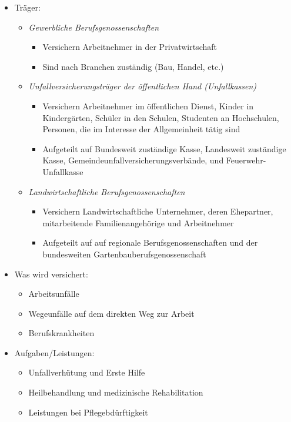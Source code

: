 \documentclass[a4paper, 12pt]{report}
\begin{document}
\begin{multicols}{2}
\begin{itemize}
    \item Träger:
	\begin{itemize}
	    \item \emph{Gewerbliche Berufsgenossenschaften}
		\begin{itemize}
		    \item Versichern Arbeitnehmer in der Privatwirtschaft
		    \item Sind nach Branchen zuständig (Bau, Handel, etc.)
		\end{itemize}
	    \item \emph{Unfallversicherungsträger der öffentlichen Hand
		(Unfallkassen)}
		\begin{itemize}
		    \item Versichern Arbeitnehmer im öffentlichen Dienst, Kinder
			in Kindergärten, Schüler in den Schulen, Studenten an
			Hochschulen, Personen, die im Interesse der
			Allgemeinheit tätig sind
		    \item Aufgeteilt auf Bundesweit zuständige Kasse, Landesweit
			zuständige Kasse, Gemeindeunfallversicherungsverbände,
			und Feuerwehr-Unfallkasse
		\end{itemize}
	    \item \emph{Landwirtschaftliche Berufsgenossenschaften}
		\begin{itemize}
		    \item Versichern Landwirtschaftliche Unternehmer, deren
			Ehepartner, mitarbeitende Familienangehörige und
			Arbeitnehmer
		    \item Aufgeteilt auf auf regionale Berufsgenossenschaften
			und der bundesweiten Gartenbauberufsgenossenschaft
		\end{itemize}
	\end{itemize}
    \item Was wird versichert:
	\begin{itemize}
	    \item Arbeitsunfälle
	    \item Wegeunfälle auf dem direkten Weg zur Arbeit
	    \item Berufskrankheiten
	\end{itemize}
    \item Aufgaben/Leistungen:
	\begin{itemize}
	    \item Unfallverhütung und Erste Hilfe
	    \item Heilbehandlung und medizinische Rehabilitation
	    \item Leistungen bei Pflegebdürftigkeit

\end{itemize}
\end{itemize}
\end{multicols}
\end{document}
